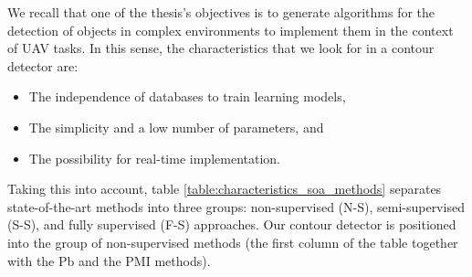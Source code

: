 We recall that one of the thesis's objectives is to generate algorithms for the detection of objects in complex environments to implement them in the context of UAV tasks. In this sense, the characteristics that we look for in a contour detector are:

\begin{itemize}
	\item The independence of databases to train learning models,
	\item The simplicity and a low number of parameters, and
	\item The possibility for real-time implementation.
\end{itemize}    

Taking this into account, table \ref{table:characteristics_soa_methods} separates state-of-the-art methods into three groups: non-supervised (N-S), semi-supervised (S-S), and fully supervised (F-S) approaches. Our contour detector is positioned into the group of non-supervised methods (the first column of the table together with the Pb and the PMI methods). 

